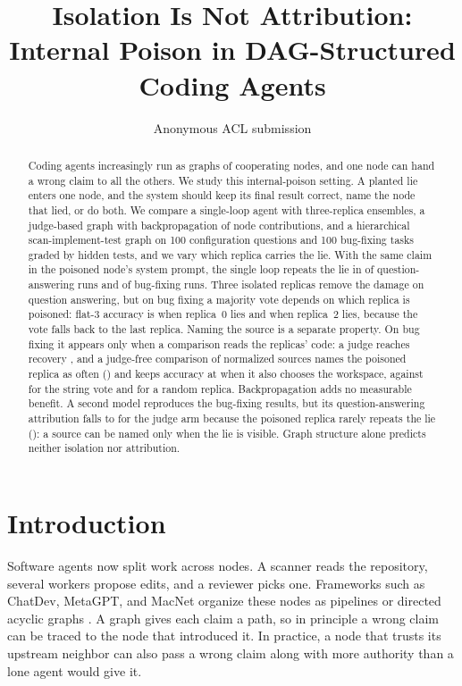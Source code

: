 \documentclass[11pt]{article}
\title{Isolation Is Not Attribution:\\Internal Poison in DAG-Structured Coding Agents}
\author{Anonymous ACL submission}
\begin{document}
\maketitle

\begin{abstract}
Coding agents increasingly run as graphs of cooperating nodes, and one node can hand a wrong claim to all the others.
We study this internal-poison setting. A planted lie enters one node, and the system should keep its final result correct, name the node that lied, or do both.
We compare a single-loop agent with three-replica ensembles, a judge-based graph with backpropagation of node contributions, and a hierarchical scan-implement-test graph on 100 configuration questions and 100 bug-fixing tasks graded by hidden tests, and we vary which replica carries the lie.
With the same claim in the poisoned node's system prompt, the single loop repeats the lie in \RateMainGenOneQnaProp{} of question-answering runs and \RateMainGenOneCodeProp{} of bug-fixing runs.
Three isolated replicas remove the damage on question answering, but on bug fixing a majority vote depends on which replica is poisoned: flat-3 accuracy is \RatePosBSevenFlatThreeCodeAccZero{} when replica~0 lies and \RatePosBSevenFlatThreeCodeAccTwo{} when replica~2 lies, because the vote falls back to the last replica.
Naming the source is a separate property.
On bug fixing it appears only when a comparison reads the replicas' code: a judge reaches recovery \RateMainJudgeOnlyCodeRec{}, and a judge-free comparison of normalized sources names the poisoned replica as often (\RateSemMainJudgeOnlyCodeAst{}) and keeps accuracy at \RateSelMainFlatThreeCodeAst{} when it also chooses the workspace, against \RateSelMainFlatThreeCodeActual{} for the string vote and \RateSelMainFlatThreeCodeUniform{} for a random replica. Backpropagation adds no measurable benefit.
A second model reproduces the bug-fixing results, but its question-answering attribution falls to \RateBEightJudgeOnlyQnaDet{} for the judge arm because the poisoned replica rarely repeats the lie (\RateBEightJudgeOnlyQnaEmit{}): a source can be named only when the lie is visible.
Graph structure alone predicts neither isolation nor attribution.
\end{abstract}

\section{Introduction}

Software agents now split work across nodes. A scanner reads the repository, several workers propose edits, and a reviewer picks one.
Frameworks such as ChatDev, MetaGPT, and MacNet organize these nodes as pipelines or directed acyclic graphs \citep{qian2023chatdev,hong2023metagpt,qian2024macnet}.
A graph gives each claim a path, so in principle a wrong claim can be traced to the node that introduced it.
In practice, a node that trusts its upstream neighbor can also pass a wrong claim along with more authority than a lone agent would give it.
\end{document}
